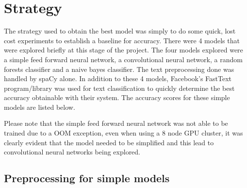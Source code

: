 \section{Strategy}
The strategy used to obtain the best model was simply to do some quick, lost cost experiments to establish a baseline 
for accuracy. There were 4 models that were explored briefly at this stage of the project. The four models explored were a simple feed forward neural network, a convolutional neural network, a random forests classifier and a naive bayes classifier. 
The text preprocessing done was handled by spaCy \cite{spacy} alone. In addition to these 4 models, Facebook's FastText \cite{fasttext} program/library was used for text classification to quickly determine the best accuracy obtainable with their system. 
The accuracy scores for these simple models are listed below. 
\vspace{3pt}

\vspace{3pt}

Please note that the simple feed forward neural network was not able to be trained due to a OOM exception, even when using a 8 node GPU cluster, it was clearly evident that the model 
needed to be simplified and this lead to convolutional neural networks being explored.

\subsection{Preprocessing for simple models}
